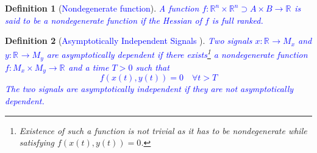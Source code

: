 \documentclass{article}
\newcommand{\R}[1]{\mathbb{R}^{#1}}
\newtheorem{definition}{Definition}
\newcommand{\textblue}[1]{\textcolor{blue}{#1}}
\begin{document}
\begin{definition}[\textblue{Nondegenerate function}]\label{def:nondegenerate_function}
\textblue{A function $f: \R{n}\times \R{n} \supset A\times B \to \R{}$ is said to be a nondegenerate function if the Hessian of $f$ is full ranked.}
\end{definition}

\begin{definition}[\textblue{Asymptotically Independent Signals \cite{mahony_complementaryFilter}}]
\textblue{Two signals $x : \R{} \to M_x$ and $y : \R{} \to M_y$ are \emph{asymptotically dependent} if there exists\footnote{Existence of such a function is not trivial as it has to be nondegenerate while satisfying $f(x(t), y(t))= 0$.} a nondegenerate function $f : M_x\times M_y \to \R{}$ and a time $T>0$ such that \[f(x(t), y(t)) = 0 \quad \forall t > T\]
The two signals are asymptotically independent if they are not asymptotically dependent.      }
\end{definition}
\end{document}
